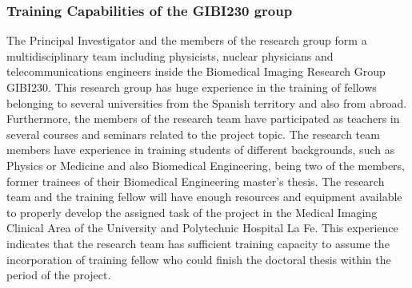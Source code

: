\subsubsection*{Training Capabilities of the GIBI230 group}
The Principal Investigator and the members of the research group form a multidisciplinary team including physicists, nuclear physicians and telecommunications engineers inside the Biomedical Imaging Research Group GIBI230. This research group has huge experience in the training of fellows belonging to several universities from the Spanish territory and also from abroad. Furthermore, the members of the research team have participated as teachers in several courses and seminars related to the project topic. 
The research team members have experience in training students of different backgrounds, such as Physics or Medicine and also Biomedical Engineering, being two of the members, former trainees of their Biomedical Engineering master’s thesis.
The research team and the training fellow will have enough resources and equipment available to properly develop the assigned task of the project in the Medical Imaging Clinical Area of the University and Polytechnic Hospital La Fe. 
This experience indicates that the research team has sufficient training capacity to assume the incorporation of training fellow who could finish the doctoral thesis within the period of the project. 

